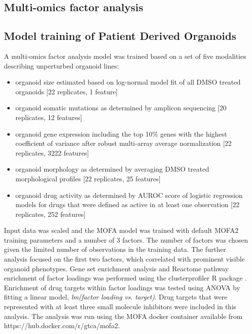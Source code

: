 \begin{flushleft}
\section{Multi-omics factor analysis}
\subsection{Model training of Patient Derived Organoids}
A multi-omics factor analysis model \citep{argelaguetMultiOmicsFactorAnalysis2018b} was trained based on a set of five modalities describing unperturbed organoid lines:

\begin{itemize}
    \item organoid size estimated based on log-normal model fit of all DMSO treated organoids [22 replicates, 1 feature]
    \item organoid somatic mutations as determined by amplicon sequencing [20 replicates, 12 features]
    \item organoid gene expression including the top 10\% genes with the highest coefficient of variance after robust multi-array average normalization [22 replicates, 3222 features]
    \item organoid morphology as determined by averaging DMSO treated morphological profiles [22 replicates, 25 features]
    \item organoid drug activity as determined by AUROC score of logistic regression models for drugs that were defined as active in at least one observation [22 replicates, 252 features]
\end{itemize}


Input data was scaled and the MOFA model was trained with default MOFA2 training parameters and a number of 3 factors. The number of factors was chosen given the limited number of observations in the training data. The further analysis focused on the first two factors, which correlated with prominent visible organoid phenotypes. Gene set enrichment analysis and Reactome pathway enrichment of factor loadings was performed using the clusterprofiler R package \citep{yuClusterProfilerPackageComparing2012}. Enrichment of drug targets within factor loadings was tested using ANOVA by fitting a linear model, \textit{lm(factor loading vs. target)}. Drug targets that were represented with at least three small molecule inhibitors were included in this analysis. The analysis was run using the MOFA docker container available from https://hub.docker.com/r/gtca/mofa2.


\end{flushleft}
